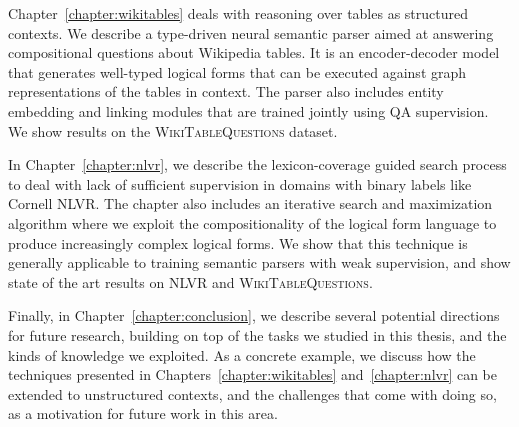 Chapter~\ref{chapter:wikitables} deals with reasoning over tables as structured contexts. We
describe a type-driven neural semantic parser aimed at answering compositional questions about
Wikipedia tables. It is an encoder-decoder model that generates well-typed logical forms that can be
executed against graph representations of the tables in context. The parser also includes entity
embedding and linking modules that are trained jointly using QA supervision. We show results on 
the \textsc{WikiTableQuestions} dataset.

In Chapter~\ref{chapter:nlvr}, we describe the lexicon-coverage guided search process to deal with
lack of sufficient supervision in domains with binary labels like Cornell NLVR\@.  The chapter also
includes an iterative search and maximization algorithm where we exploit the compositionality of the
logical form language to produce increasingly complex logical forms. We show that this technique is
generally applicable to training semantic parsers with weak supervision, and show state of the art
results on NLVR and \textsc{WikiTableQuestions}.

Finally, in Chapter~\ref{chapter:conclusion}, we describe several potential directions for
future research, building on top of the tasks we studied in this thesis, and the kinds of knowledge
we exploited. As a concrete example, we discuss how the techniques presented in
Chapters~\ref{chapter:wikitables} and~\ref{chapter:nlvr} can be extended to unstructured contexts,
and the challenges that come with doing so, as a motivation for future work in this area.
